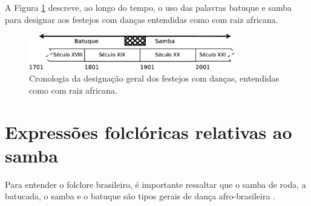 A Figura \ref{fig:sambacrono} descreve, ao longo do tempo, o uso das palavras batuque e samba
para designar aos festejos com danças entendidas como com raiz africana.
\begin{figure}[h]
  \centering
    \includegraphics[width=0.8\textwidth]{chapters/cap-historia-samba/samba-crono.eps}
  \caption{Cronologia da designação geral dos festejos com danças, entendidas como com raiz africana.}
  \label{fig:sambacrono}
\end{figure}

\section{Expressões folclóricas relativas ao samba}

Para entender o folclore brasileiro, 
é importante ressaltar que o samba de roda, a batucada, 
o samba e o batuque são tipos gerais de dança afro-brasileira \cite[pp. 8]{reffolclorebatucadajornal} \cite[pp. 21]{jornalsambaderoda1}.
 

